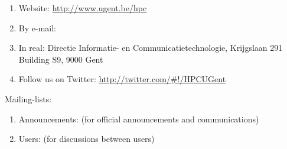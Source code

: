 \begin{enumerate}
\item  Website: \url{http://www.ugent.be/hpc}
\item  By e-mail:  \hpcinfo
\item  In real: Directie Informatie- en Communicatietechnologie, Krijgslaan 291 Building S9, 9000 Gent
\item  Follow us on Twitter: \url{http://twitter.com/#!/HPCUGent}
\end{enumerate}

Mailing-lists:

\begin{enumerate}
\item  Announcements: \hpcannounceml (for official announcements and communications)
\item  Users: \hpcusersml (for discussions between users)
\end{enumerate}

